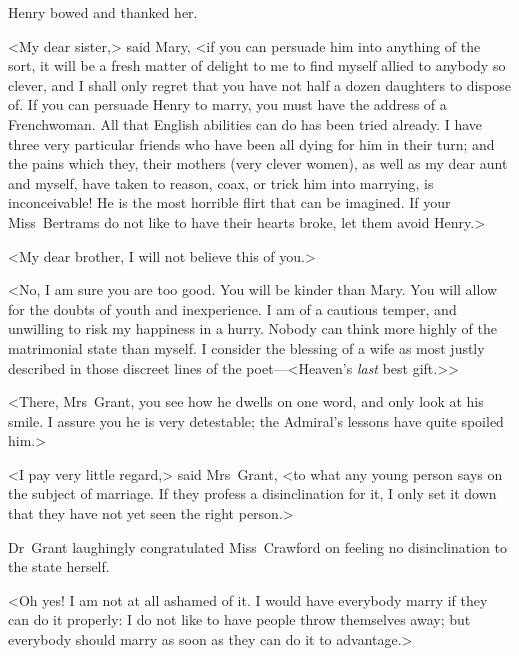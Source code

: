 Henry bowed and thanked her.

<My dear sister,> said Mary, <if you can persuade him into anything of the sort, it will be a fresh matter of delight to me to find myself allied to anybody so clever, and I shall only regret that you have not half a dozen daughters to dispose of. If you can persuade Henry to marry, you must have the address of a Frenchwoman. All that English abilities can do has been tried already. I have three very particular friends who have been all dying for him in their turn; and the pains which they, their mothers (very clever women), as well as my dear aunt and myself, have taken to reason, coax, or trick him into marrying, is inconceivable! He is the most horrible flirt that can be imagined. If your Miss~Bertrams do not like to have their hearts broke, let them avoid Henry.>

<My dear brother, I will not believe this of you.>

<No, I am sure you are too good. You will be kinder than Mary. You will allow for the doubts of youth and inexperience. I am of a cautious temper, and unwilling to risk my happiness in a hurry. Nobody can think more highly of the matrimonial state than myself. I consider the blessing of a wife as most justly described in those discreet lines of the poet—<Heaven's \textit{last}  best gift.>>

<There, Mrs~Grant, you see how he dwells on one word, and only look at his smile. I assure you he is very detestable; the Admiral's lessons have quite spoiled him.>

<I pay very little regard,> said Mrs~Grant, <to what any young person says on the subject of marriage. If they profess a disinclination for it, I only set it down that they have not yet seen the right person.>

Dr~Grant laughingly congratulated Miss~Crawford on feeling no disinclination to the state herself.

<Oh yes! I am not at all ashamed of it. I would have everybody marry if they can do it properly: I do not like to have people throw themselves away; but everybody should marry as soon as they can do it to advantage.> 